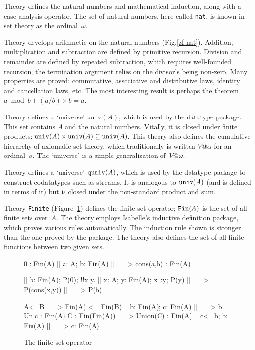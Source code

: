 Theory  defines the natural numbers and mathematical
induction, along with a case analysis operator.  The set of natural
numbers, here called \texttt{nat}, is known in set theory as the ordinal~$\omega$.

Theory  develops arithmetic on the natural numbers
(Fig.\ts\ref{zf-nat}).  Addition, multiplication and subtraction are defined
by primitive recursion.  Division and remainder are defined by repeated
subtraction, which requires well-founded recursion; the termination argument
relies on the divisor's being non-zero.  Many properties are proved:
commutative, associative and distributive laws, identity and cancellation
laws, etc.  The most interesting result is perhaps the theorem $a \bmod b +
(a/b)\times b = a$.

Theory  defines a `universe' $\texttt{univ}(A)$, which is used by
the datatype package.  This set contains $A$ and the
natural numbers.  Vitally, it is closed under finite products: ${\tt
  univ}(A)\times{\tt univ}(A)\subseteq{\tt univ}(A)$.  This theory also
defines the cumulative hierarchy of axiomatic set theory, which
traditionally is written $V@\alpha$ for an ordinal~$\alpha$.  The
`universe' is a simple generalization of~$V@\omega$.

Theory  defines a `universe' ${\tt quniv}(A)$, which is used by
the datatype package to construct codatatypes such as streams.  It is
analogous to ${\tt univ}(A)$ (and is defined in terms of it) but is closed
under the non-standard product and sum.

Theory \texttt{Finite} (Figure~\ref{zf-fin}) defines the finite set operator;
${\tt Fin}(A)$ is the set of all finite sets over~$A$.  The theory employs
Isabelle's inductive definition package, which proves various rules
automatically.  The induction rule shown is stronger than the one proved by
the package.  The theory also defines the set of all finite functions
between two given sets.

\begin{figure}
\begin{ttbox}
      0 : Fin(A)
       [| a: A;  b: Fin(A) |] ==> cons(a,b) : Fin(A)

    [| b: Fin(A);
       P(0);
       !!x y. [| x: A;  y: Fin(A);  x~:y;  P(y) |] ==> P(cons(x,y))
    |] ==> P(b)

        A<=B ==> Fin(A) <= Fin(B)
         [| b: Fin(A);  c: Fin(A) |] ==> b Un c : Fin(A)
      C : Fin(Fin(A)) ==> Union(C) : Fin(A)
      [| c<=b;  b: Fin(A) |] ==> c: Fin(A)
\end{ttbox}
\caption{The finite set operator} \label{zf-fin}
\end{figure}


